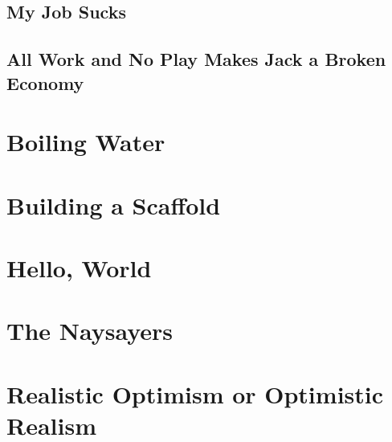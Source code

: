 \documentclass[12pt]{memoir}
\begin{document}
		\section{My Job Sucks}
		
		\section{All Work and No Play Makes Jack a Broken Economy}
		
		
	\chapter{Boiling Water}
	
	\chapter{Building a Scaffold}
	
	\chapter{Hello, World}
	
	\chapter{The Naysayers}
	
	\chapter{Realistic Optimism or Optimistic Realism}
	
	
	
	
\end{document}
